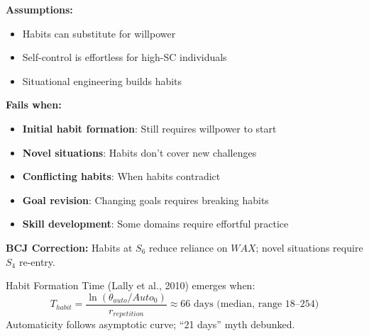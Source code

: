 \begin{tcolorbox}[colback=red!5!white, colframe=red!75!black, title=Boundary Condition: Where Self-Control as Habit Fails]
\textbf{Assumptions:}
\begin{itemize}[nosep]
\item Habits can substitute for willpower
\item Self-control is effortless for high-SC individuals
\item Situational engineering builds habits
\end{itemize}

\textbf{Fails when:}
\begin{itemize}[nosep]
\item \textbf{Initial habit formation}: Still requires willpower to start
\item \textbf{Novel situations}: Habits don't cover new challenges
\item \textbf{Conflicting habits}: When habits contradict
\item \textbf{Goal revision}: Changing goals requires breaking habits
\item \textbf{Skill development}: Some domains require effortful practice
\end{itemize}

\textbf{BCJ Correction:} Habits at $S_6$ reduce reliance on $WAX$; novel situations require $S_4$ re-entry.
\end{tcolorbox}


\begin{theorem}
\label{thm:habit-formation-time}
Habit Formation Time (Lally et al., 2010) emerges when:
\begin{equation}
\boxed{T_{habit} = \frac{\ln(\theta_{auto} / Auto_0)}{r_{repetition}} \approx 66 \text{ days (median, range 18--254)}}
\end{equation}
Automaticity follows asymptotic curve; ``21 days'' myth debunked.
\end{theorem}

